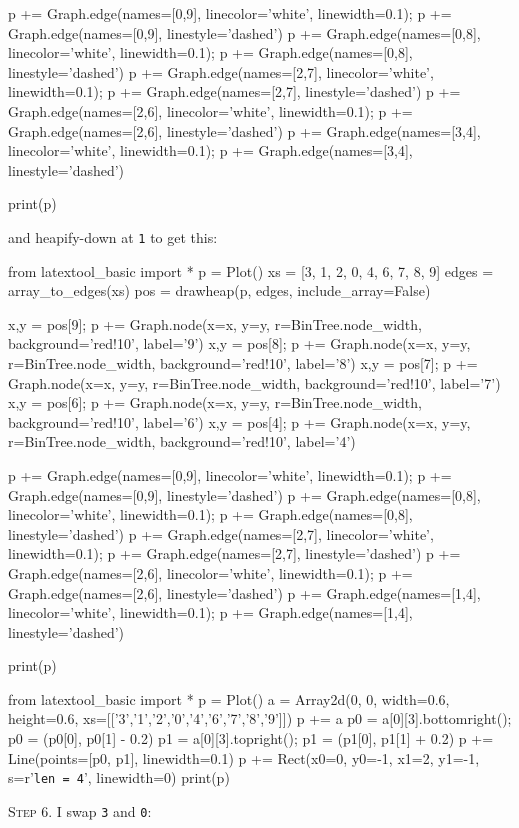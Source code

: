 p += Graph.edge(names=[0,9], linecolor='white', linewidth=0.1); p += Graph.edge(names=[0,9], linestyle='dashed')
p += Graph.edge(names=[0,8], linecolor='white', linewidth=0.1); p += Graph.edge(names=[0,8], linestyle='dashed')
p += Graph.edge(names=[2,7], linecolor='white', linewidth=0.1); p += Graph.edge(names=[2,7], linestyle='dashed')
p += Graph.edge(names=[2,6], linecolor='white', linewidth=0.1); p += Graph.edge(names=[2,6], linestyle='dashed')
p += Graph.edge(names=[3,4], linecolor='white', linewidth=0.1); p += Graph.edge(names=[3,4], linestyle='dashed')

print(p)

and heapify-down at \texttt{1} to get this:


from latextool_basic import *
p = Plot()
xs = [3, 1, 2, 0, 4, 6, 7, 8, 9]
edges = array_to_edges(xs)
pos = drawheap(p, edges, include_array=False)

x,y = pos[9]; p += Graph.node(x=x, y=y, r=BinTree.node_width, background='red!10', label='9')
x,y = pos[8]; p += Graph.node(x=x, y=y, r=BinTree.node_width, background='red!10', label='8')
x,y = pos[7]; p += Graph.node(x=x, y=y, r=BinTree.node_width, background='red!10', label='7')
x,y = pos[6]; p += Graph.node(x=x, y=y, r=BinTree.node_width, background='red!10', label='6')
x,y = pos[4]; p += Graph.node(x=x, y=y, r=BinTree.node_width, background='red!10', label='4')

p += Graph.edge(names=[0,9], linecolor='white', linewidth=0.1); p += Graph.edge(names=[0,9], linestyle='dashed')
p += Graph.edge(names=[0,8], linecolor='white', linewidth=0.1); p += Graph.edge(names=[0,8], linestyle='dashed')
p += Graph.edge(names=[2,7], linecolor='white', linewidth=0.1); p += Graph.edge(names=[2,7], linestyle='dashed')
p += Graph.edge(names=[2,6], linecolor='white', linewidth=0.1); p += Graph.edge(names=[2,6], linestyle='dashed')
p += Graph.edge(names=[1,4], linecolor='white', linewidth=0.1); p += Graph.edge(names=[1,4], linestyle='dashed')

print(p)

from latextool_basic import *
p = Plot()
a = Array2d(0, 0, width=0.6, height=0.6, 
             xs=[['3','1','2','0','4','6','7','8','9']])
p += a
p0 = a[0][3].bottomright(); p0 = (p0[0], p0[1] - 0.2)
p1 = a[0][3].topright(); p1 = (p1[0], p1[1] + 0.2)
p += Line(points=[p0, p1], linewidth=0.1)
p += Rect(x0=0, y0=-1, x1=2, y1=-1, s=r'\texttt{len = 4}', linewidth=0) 
print(p)


\textsc{Step 6}.
I swap \texttt{3} and \texttt{0}:

